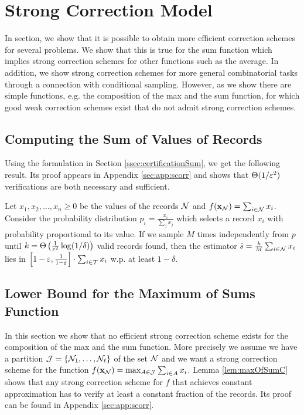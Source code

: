 \section{Strong Correction Model} \label{sec:scorr}

  In section, we show that it is possible to obtain more efficient correction schemes for several problems. 
  We show that this is true for the sum function which implies strong correction schemes for other functions such as the average. 
  In addition, we show strong correction schemes for more general combinatorial tasks through a connection with conditional sampling.
  However, as we show there are 
simple functions, e.g. the composition of the max and the sum function, for which good weak correction schemes exist that do not admit strong correction schemes.

\subsection{Computing the Sum of Values of Records}

 Using the formulation in Section \ref{ssec:certificationSum}, we get the following result. Its proof appears in Appendix \ref{sec:app:scorr} and shows that $\Theta(1/\varepsilon^2)$ verifications are both necessary and sufficient.

  
\begin{lemma} \label{lem:sumC}
    Let $x_1, x_2, \dots, x_n \ge 0$ be the values of the records $\mathcal{N}$ and $f(\mathbf{x}_{\mathcal{N}}) = \sum_{i \in \mathcal{N}} x_i$.
  Consider the probability distribution $p_i = \frac {x_i} {\sum_j x_j}$ which selects a record $x_i$ with probability 
  proportional to its value. If we sample $M$ times independently from $p$ until 
  $k = \Theta\left(\frac{1}{\varepsilon^2}\log (1/\delta)\right)$ valid records found, then the estimator 
  $\hat{s} = \frac{k}{M} \sum_{i \in \mathcal{N}} x_i$ lies in
  $\left[ 1 - \varepsilon, \frac{1}{1 - \varepsilon} \right] \cdot \sum_{i \in \mathcal{T}} x_i$ w.p. at least $1 - \delta$. 
\end{lemma}


\subsection{Lower Bound for the Maximum of Sums Function}

  In this section we show that no efficient strong correction scheme exists for the composition of the max and the sum function. 
More precisely we assume we have a partition $\mathcal{J} = \{\mathcal{N}_1, \dots, \mathcal{N}_{\ell}\}$ of the set $\mathcal{N}$ and we 
want a strong correction scheme for the function $f(\mathbf{x}_{\mathcal{N}}) = \max_{A \in \mathcal{J}} \sum_{i \in A} x_i$. Lemma \ref{lem:maxOfSumC} shows that any strong 
correction scheme for $f$ that achieves constant approximation has to verify at least a constant fraction of the records. Its proof can be found in Appendix \ref{sec:app:scorr}. 

